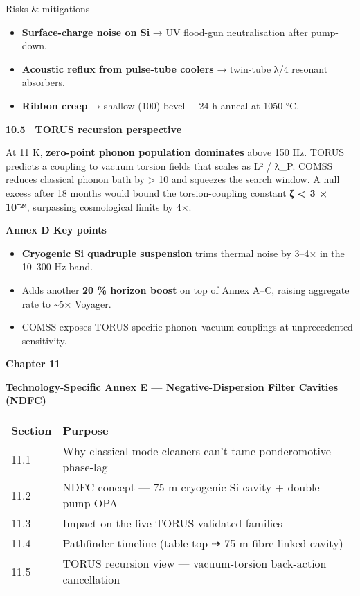 \documentclass[]{article}
\begin{document}
Risks \& mitigations

\begin{itemize}
\item
  \textbf{Surface-charge noise on Si} → UV flood-gun neutralisation
  after pump-down.
\item
  \textbf{Acoustic reflux from pulse-tube coolers} → twin-tube λ/4
  resonant absorbers.
\item
  \textbf{Ribbon creep} → shallow (100) bevel + 24 h anneal at 1050 °C.
\end{itemize}

\textbf{10.5 TORUS recursion perspective}

At 11 K, \textbf{zero-point phonon population dominates} above 150 Hz.
TORUS predicts a coupling to vacuum torsion fields that scales as L² /
λ\_P. COMSS reduces classical phonon bath by \textgreater{} 10 and
squeezes the search window. A null excess after 18 months would bound
the torsion-coupling constant \textbf{ζ \textless{} 3 × 10⁻²⁴},
surpassing cosmological limits by 4×.

\textbf{Annex D Key points}

\begin{itemize}
\item
  \textbf{Cryogenic Si quadruple suspension} trims thermal noise by
  3--4× in the 10--300 Hz band.
\item
  Adds another \textbf{20 \% horizon boost} on top of Annex A--C,
  raising aggregate rate to \textasciitilde{}5× Voyager.
\item
  COMSS exposes TORUS-specific phonon--vacuum couplings at unprecedented
  sensitivity.
\end{itemize}

\textbf{Chapter 11}

\textbf{Technology-Specific Annex E --- Negative-Dispersion Filter
Cavities (NDFC)}

\begin{longtable}[]{@{}ll@{}}
\toprule
\textbf{Section} & \textbf{Purpose}\tabularnewline
\midrule
\endhead
11.1 & Why classical mode-cleaners can't tame ponderomotive
phase-lag\tabularnewline
11.2 & NDFC concept --- 75 m cryogenic Si cavity + double-pump
OPA\tabularnewline
11.3 & Impact on the five TORUS-validated families\tabularnewline
11.4 & Pathfinder timeline (table-top ⇢ 75 m fibre-linked
cavity)\tabularnewline
11.5 & TORUS recursion view --- vacuum-torsion back-action
cancellation\tabularnewline
\bottomrule
\end{longtable}
\end{document}
